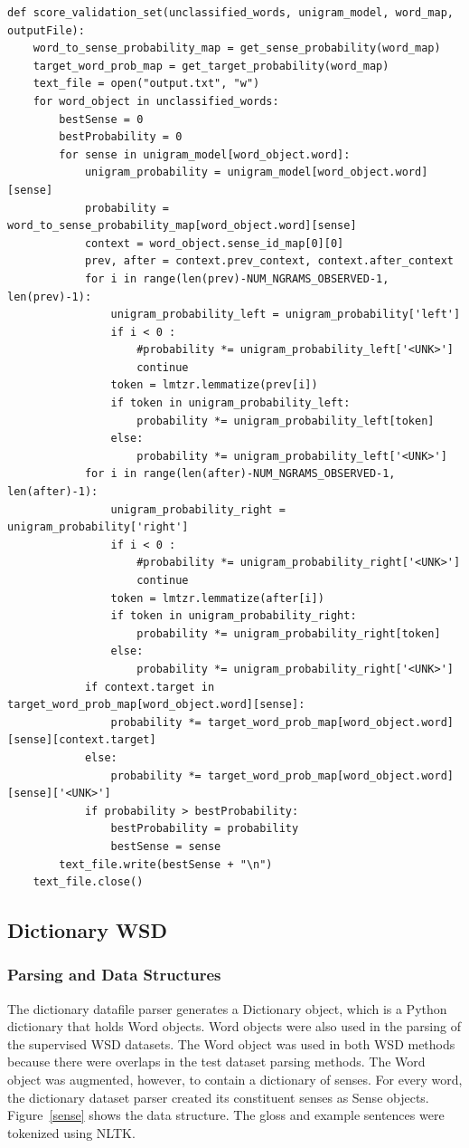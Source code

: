 \documentclass[11pt]{article}
\begin{document}
\begin{lstlisting}
def score_validation_set(unclassified_words, unigram_model, word_map, outputFile):
    word_to_sense_probability_map = get_sense_probability(word_map)
    target_word_prob_map = get_target_probability(word_map)
    text_file = open("output.txt", "w")
    for word_object in unclassified_words:
        bestSense = 0
        bestProbability = 0
        for sense in unigram_model[word_object.word]:
            unigram_probability = unigram_model[word_object.word][sense]
            probability = word_to_sense_probability_map[word_object.word][sense]
            context = word_object.sense_id_map[0][0]
            prev, after = context.prev_context, context.after_context
            for i in range(len(prev)-NUM_NGRAMS_OBSERVED-1, len(prev)-1):
                unigram_probability_left = unigram_probability['left']
                if i < 0 :
                    #probability *= unigram_probability_left['<UNK>']
                    continue
                token = lmtzr.lemmatize(prev[i])
                if token in unigram_probability_left:
                    probability *= unigram_probability_left[token]
                else:
                    probability *= unigram_probability_left['<UNK>']
            for i in range(len(after)-NUM_NGRAMS_OBSERVED-1, len(after)-1):
                unigram_probability_right = unigram_probability['right']
                if i < 0 :
                    #probability *= unigram_probability_right['<UNK>']
                    continue
                token = lmtzr.lemmatize(after[i])
                if token in unigram_probability_right:
                    probability *= unigram_probability_right[token]
                else:
                    probability *= unigram_probability_right['<UNK>']
            if context.target in target_word_prob_map[word_object.word][sense]:
                probability *= target_word_prob_map[word_object.word][sense][context.target]
            else:
                probability *= target_word_prob_map[word_object.word][sense]['<UNK>']
            if probability > bestProbability:
                bestProbability = probability
                bestSense = sense
        text_file.write(bestSense + "\n")
    text_file.close()
\end{lstlisting}		
	

\subsection{Dictionary WSD}
\subsubsection{Parsing and Data Structures}
The dictionary datafile parser generates a Dictionary object, which is a Python dictionary that holds Word objects. Word objects were also used in the parsing of the supervised WSD datasets. The Word object was used in both WSD methods because there were overlaps in the test dataset parsing methods. The Word object was augmented, however, to contain a dictionary of senses. For every word, the dictionary dataset parser created its constituent senses as Sense objects. Figure~\ref{sense} shows the data structure. The gloss and example sentences were tokenized using NLTK.
\end{document}
